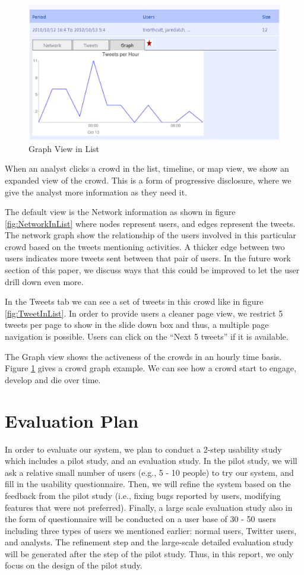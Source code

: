 \documentclass{sig-alternate}
\begin{document}
\begin{figure}
\centering
\includegraphics[width=\linewidth]{imgs/GraphInList.png}
\caption{Graph View in List}
\label{fig:GraphInList}
\end{figure}
When an analyst clicks a crowd in the list, timeline, or map view, we show an
expanded view of the crowd. This is a form of progressive disclosure, where we
give the analyst more information as they need it.  

The default view is the Network information as shown in figure
\ref{fig:NetworkInList} where nodes represent users, and edges represent the
tweets. The network graph show the relationship of the users involved in this
particular crowd based on the tweets mentioning activities. A thicker edge
between two users indicates more tweets sent between that pair of users. In the
future work section of this paper, we discuss ways that this could be improved
to let the user drill down even more.

In the Tweets tab we can see a set of tweets in this crowd like in figure
\ref{fig:TweetInList}. In order to provide users a cleaner page view, we
restrict 5 tweets per page to show in the slide down box and thus, a multiple
page navigation is possible. Users can click on the ``Next 5 tweets'' if it is
available.

The Graph view shows the activeness of the crowds in an hourly time basis.
Figure \ref{fig:GraphInList} gives a crowd graph example. We can see how a
crowd start to engage, develop and die over time.


\section{Evaluation Plan}
In order to evaluate our system, we plan to conduct a 2-step usability study
which includes a pilot study, and an evaluation study. In the pilot study, we
will ask a relative small number of users (e.g., 5 - 10 people) to try our
system, and fill in the usability questionnaire. Then, we will refine the system
based on the feedback from the pilot study (i.e., fixing bugs reported by users,
modifying features that were not preferred). Finally, a large scale evaluation
study also in the form of questionnaire will be conducted on a user base of 30 -
50 users including three types of users we mentioned earlier: normal users, 
Twitter users, and analysts. The refinement step and the large-scale detailed
evaluation study will be generated after the step of the pilot study. Thus, in
this report, we only focus on the design of the pilot study.
\end{document}

